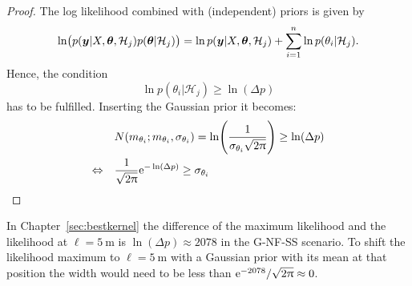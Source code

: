 \begin{proof}
    The log likelihood combined with (independent) priors is given by
    \begin{equation*}
        \ln\!\del{p(\vc y | X, \vc \theta, \mathcal{H}_j) p(\vc \theta 
            | \mathcal{H}_j)} = \ln p(\vc y | X, \vc \theta, \mathcal{H}_j) 
        + \sum_{i = 1}^n \ln p(\theta_i | \mathcal{H}_j) \text{.}
    \end{equation*}
    Hence, the condition
    \begin{equation*}
        \ln p(\theta_i | \mathcal{H}_j) \geq \ln(\Delta p)
    \end{equation*}
    has to be fulfilled. Inserting the Gaussian prior it becomes:
    \begin{align*}
        &N(m_{\theta_i}; m_{\theta_i}, \sigma_{\theta_i}) 
        = \ln\!\del{\frac{1}{\sigma_{\theta_i} \sqrt{2\uppi}}} \geq \ln(\Delta 
        p) \\
        \Leftrightarrow\quad & \frac{1}{\sqrt{2\uppi}} \e^{-\ln(\Delta p)} \geq 
        \sigma_{\theta_i}
    \end{align*}
\end{proof}

In Chapter~\ref{sec:bestkernel} the difference of the maximum likelihood and the 
likelihood at $\ell = \SI{5}{\meter}$ is $\ln(\Delta p) \approx 2078$ in the 
G-NF-SS scenario. To shift the likelihood maximum to $\ell = \SI{5}{\meter}$ 
with a Gaussian prior with its mean at that position the width would need to be 
less than $\mathrm{e}^{-2078} / \sqrt{2\uppi} \approx 0$.
